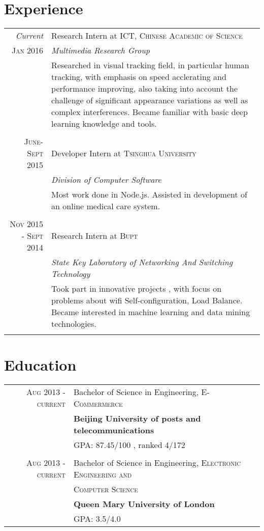 \documentclass[a4paper,10pt]{article}
\begin{document}
\section{Experience}
\begin{tabular}{r|p{11cm}}
 \emph{Current} & Research Intern at \textsc{ICT, Chinese Academic of Science} \\\textsc{Jan 2016}&\emph{Multimedia Research Group}\\&\footnotesize{Researched in visual tracking field, in particular human tracking, with emphasis on speed acclerating and performance improving, also taking into account the challenge of significant appearance variations as well as complex interferences. Became familiar with basic deep learning knowledge and tools.}\\\multicolumn{2}{c}{} \\
 \textsc{June-Sept 2015} & Developer Intern at \textsc{Tsinghua University}  \\&\emph{Division of Computer Software}\\&\footnotesize{Most work done in Node.js. Assisted in development of an online medical care system.}\\\multicolumn{2}{c}{} \\
 \textsc{Nov 2015 - Sept 2014} & Research Intern at \textsc{Bupt}  \\&\emph{State Key Laboratory of Networking And Switching Technology}\\&\footnotesize{Took part in innovative projects , with focus on problems about wifi Self-configuration, Load Balance. Became interested in machine learning and data mining technologies.}\\\multicolumn{2}{c}{} \\
\end{tabular}

\section{Education}
\begin{tabular}{rl}	
 \textsc{Aug 2013} - \textsc{current} & Bachelor of Science in Engineering, \textsc{E-Commermerce}\\
& \textbf{Beijing University of posts and telecommunications}\\
& \textsc{GPA: 87.45/100}  , ranked \textsc{4/172}\\
\\

 \textsc{Aug 2013} - \textsc{current} & Bachelor of Science in Engineering, \textsc{Electronic Engineering and}\\
&  \textsc{Computer Science}\\
& \textbf{Queen Mary University of London}\\
& \textsc{GPA: 3.5/4.0}  \\
\end{tabular}
\end{document}
